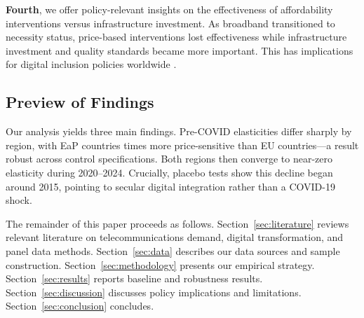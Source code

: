 \textbf{Fourth}, we offer policy-relevant insights on the effectiveness of affordability interventions versus infrastructure investment. As broadband transitioned to necessity status, price-based interventions lost effectiveness while infrastructure investment and quality standards became more important. This has implications for digital inclusion policies worldwide \citep{guermazi2021digital}.

\subsection{Preview of Findings}

Our analysis yields three main findings. Pre-COVID elasticities differ sharply by region, with EaP countries \EaPEURatio{} times more price-sensitive than EU countries---a result robust across \NPerMeasure{} control specifications. Both regions then converge to near-zero elasticity during 2020--2024. Crucially, placebo tests show this decline began around 2015, pointing to secular digital integration rather than a COVID-19 shock.

The remainder of this paper proceeds as follows. Section~\ref{sec:literature} reviews relevant literature on telecommunications demand, digital transformation, and panel data methods. Section~\ref{sec:data} describes our data sources and sample construction. Section~\ref{sec:methodology} presents our empirical strategy. Section~\ref{sec:results} reports baseline and robustness results. Section~\ref{sec:discussion} discusses policy implications and limitations. Section~\ref{sec:conclusion} concludes.
